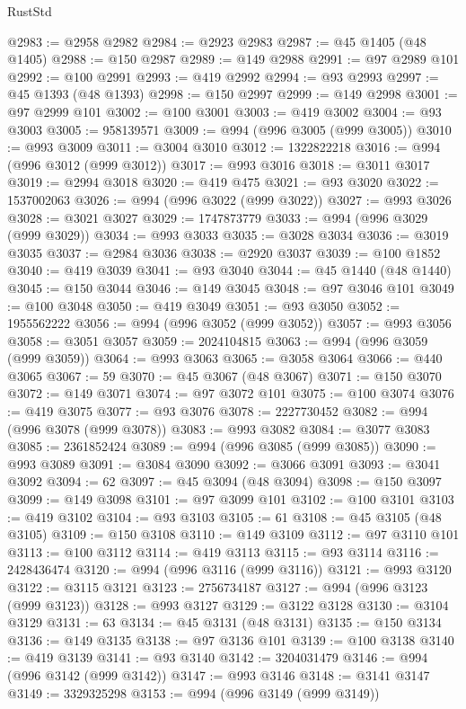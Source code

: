 \begin{lexlean}{RustStd}
\begin{coremodule}
@2983 := @2958 @2982
@2984 := @2923 @2983
@2987 := @45 @1405 (@48 @1405)
@2988 := @150 @2987
@2989 := @149 @2988
@2991 := @97 @2989 @101
@2992 := @100 @2991
@2993 := @419 @2992
@2994 := @93 @2993
@2997 := @45 @1393 (@48 @1393)
@2998 := @150 @2997
@2999 := @149 @2998
@3001 := @97 @2999 @101
@3002 := @100 @3001
@3003 := @419 @3002
@3004 := @93 @3003
@3005 := 958139571
@3009 := @994 (@996 @3005 (@999 @3005))
@3010 := @993 @3009
@3011 := @3004 @3010
@3012 := 1322822218
@3016 := @994 (@996 @3012 (@999 @3012))
@3017 := @993 @3016
@3018 := @3011 @3017
@3019 := @2994 @3018
@3020 := @419 @475
@3021 := @93 @3020
@3022 := 1537002063
@3026 := @994 (@996 @3022 (@999 @3022))
@3027 := @993 @3026
@3028 := @3021 @3027
@3029 := 1747873779
@3033 := @994 (@996 @3029 (@999 @3029))
@3034 := @993 @3033
@3035 := @3028 @3034
@3036 := @3019 @3035
@3037 := @2984 @3036
@3038 := @2920 @3037
@3039 := @100 @1852
@3040 := @419 @3039
@3041 := @93 @3040
@3044 := @45 @1440 (@48 @1440)
@3045 := @150 @3044
@3046 := @149 @3045
@3048 := @97 @3046 @101
@3049 := @100 @3048
@3050 := @419 @3049
@3051 := @93 @3050
@3052 := 1955562222
@3056 := @994 (@996 @3052 (@999 @3052))
@3057 := @993 @3056
@3058 := @3051 @3057
@3059 := 2024104815
@3063 := @994 (@996 @3059 (@999 @3059))
@3064 := @993 @3063
@3065 := @3058 @3064
@3066 := @440 @3065
@3067 := 59
@3070 := @45 @3067 (@48 @3067)
@3071 := @150 @3070
@3072 := @149 @3071
@3074 := @97 @3072 @101
@3075 := @100 @3074
@3076 := @419 @3075
@3077 := @93 @3076
@3078 := 2227730452
@3082 := @994 (@996 @3078 (@999 @3078))
@3083 := @993 @3082
@3084 := @3077 @3083
@3085 := 2361852424
@3089 := @994 (@996 @3085 (@999 @3085))
@3090 := @993 @3089
@3091 := @3084 @3090
@3092 := @3066 @3091
@3093 := @3041 @3092
@3094 := 62
@3097 := @45 @3094 (@48 @3094)
@3098 := @150 @3097
@3099 := @149 @3098
@3101 := @97 @3099 @101
@3102 := @100 @3101
@3103 := @419 @3102
@3104 := @93 @3103
@3105 := 61
@3108 := @45 @3105 (@48 @3105)
@3109 := @150 @3108
@3110 := @149 @3109
@3112 := @97 @3110 @101
@3113 := @100 @3112
@3114 := @419 @3113
@3115 := @93 @3114
@3116 := 2428436474
@3120 := @994 (@996 @3116 (@999 @3116))
@3121 := @993 @3120
@3122 := @3115 @3121
@3123 := 2756734187
@3127 := @994 (@996 @3123 (@999 @3123))
@3128 := @993 @3127
@3129 := @3122 @3128
@3130 := @3104 @3129
@3131 := 63
@3134 := @45 @3131 (@48 @3131)
@3135 := @150 @3134
@3136 := @149 @3135
@3138 := @97 @3136 @101
@3139 := @100 @3138
@3140 := @419 @3139
@3141 := @93 @3140
@3142 := 3204031479
@3146 := @994 (@996 @3142 (@999 @3142))
@3147 := @993 @3146
@3148 := @3141 @3147
@3149 := 3329325298
@3153 := @994 (@996 @3149 (@999 @3149))

\end{coremodule}
\end{lexlean}
